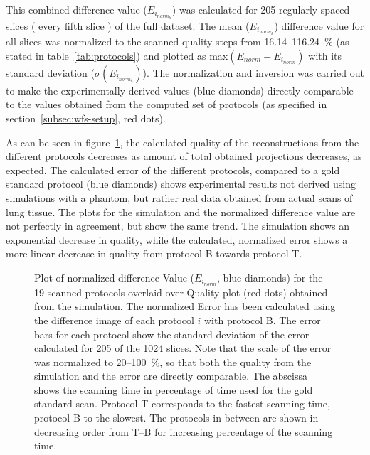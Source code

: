 This combined difference value ($E_{i_{norm_{k}}}$) was calculated for 205 regularly spaced slices (%
every fifth slice%
) of the full dataset. The mean ($\overline{E_{i_{norm_{k}}}}$) difference value for all slices was normalized to the scanned quality-steps from 16.14--\SI{116.24}{\percent} (as stated in table~\ref{tab:protocols}) and plotted as max$(E_{norm}-E_{i_{norm}})$ with its standard deviation ($\sigma(E_{i_{norm_{k}}})$). The normalization and inversion was carried out to make the experimentally derived values (blue diamonds) directly comparable to the values obtained from the computed set of protocols (as specified in section~\ref{subsec:wfs-setup}, red dots).

As can be seen in figure~\ref{fig:NormalizedErrorPlot}, the calculated quality of the reconstructions from the different protocols decreases as amount of total obtained projections decreases, as expected. The calculated error of the different protocols, compared to a gold standard protocol (blue diamonds) shows experimental results not derived using simulations with a phantom, but rather real data obtained from actual scans of lung tissue. The plots for the simulation and the normalized difference value are not perfectly in agreement, but show the same trend. The simulation shows an exponential decrease in quality, while the calculated, normalized error shows a more linear decrease in quality from protocol B towards protocol T.

\begin{figure}
	\centering
	\caption{Plot of normalized difference Value ($E_{i_{norm}}$, blue diamonds) for the 19 scanned protocols overlaid over Quality-plot (red dots) obtained from the simulation. The normalized Error has been calculated using the difference image of each protocol $i$ with protocol B. The error bars for each protocol show the standard deviation of the error calculated for 205 of the 1024 slices. Note that the scale of the error was normalized to 20--\SI{100}{\percent}, so that both the quality from the simulation and the error are directly comparable. The abscissa shows the scanning time in percentage of time used for the gold standard scan. Protocol T corresponds to the fastest scanning time, protocol B to the slowest. The protocols in between are shown in decreasing order from T--B for increasing percentage of the scanning time.}
	\ifiucr		
		
	\else
	\fi
	\label{fig:NormalizedErrorPlot}
\end{figure}

